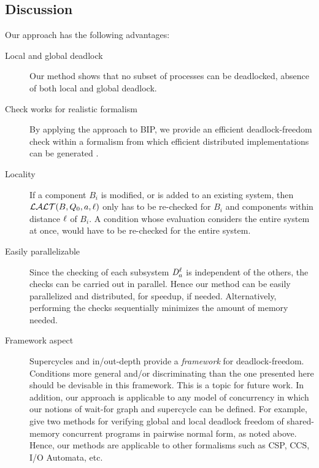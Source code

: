 \subsection{Discussion}
Our approach has the following advantages:
\begin{description}

\item[Local and global deadlock] Our method shows that no subset of processes
  can be deadlocked, \ie absence of both local and global deadlock. 

\item[Check works for realistic formalism]   By applying the approach to BIP, we
provide an efficient deadlock-freedom check within a formalism from
which efficient distributed implementations can be generated
\cite{BonakdarpourBJQS10b}.  

\item[Locality] If a component $B_i$ is modified, or is added to an
  existing system, then $\mathcal{LALT}(B, Q_0, a, \ell)$ only has to
  be re-checked for $B_i$ and components within distance $\ell$ of $B_i$.
  A condition whose evaluation considers the entire
  system at once, \eg \cite{AB03,DFinder2,GS03}
  would have to be re-checked for the entire system. 

\item[Easily parallelizable] Since the checking of each subsystem $\mathit{D}_{a}^{\ell}$
  is independent of the others, the checks can be carried out in parallel. Hence
  our method can be easily parallelized and distributed, for speedup, if needed.
  Alternatively, performing the checks sequentially
  minimizes the amount of memory needed. 

\item[Framework aspect] Supercycles and in/out-depth provide a \emph{framework} for
  deadlock-freedom. Conditions more general and/or discriminating than
  the one presented here 
  should be devisable in this framework. This is a topic for future work.
In addition, our approach is applicable to any model of concurrency in
which our notions of wait-for graph and supercycle can be defined. For example,  
give two methods for verifying global
and local deadlock freedom of shared-memory concurrent programs in pairwise normal form, as noted above.
Hence, our methods are applicable to other formalisms such as CSP, CCS, I/O Automata, etc.


\end{description}


